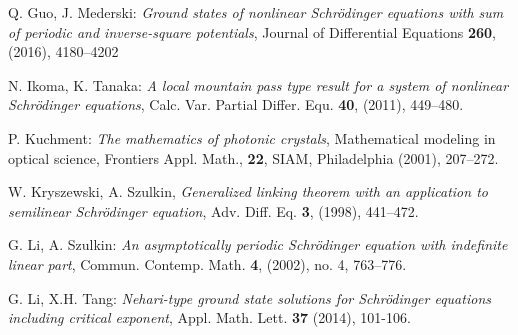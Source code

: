 \documentclass{scrartcl}
\newcommand{\R}{\mathbb{R}}
\numberwithin{equation}{section}
\begin{document}
\begin{thebibliography}{99}
 Q. Guo, J. Mederski: {\em Ground states of nonlinear Schr\"odinger equations with sum of periodic and inverse-square potentials}, Journal of Differential Equations \textbf{260}, (2016), 4180--4202

 N. Ikoma, K. Tanaka: {\em A local mountain pass type result for a system of nonlinear Schr\"odinger equations}, Calc. Var. Partial Differ. Equ. \textbf{40}, (2011), 449--480.



 P. Kuchment: {\em The mathematics of photonic crystals}, Mathematical modeling in optical science, Frontiers Appl. Math., \textbf{22}, SIAM, Philadelphia (2001), 207--272.

 W. Kryszewski, A. Szulkin, {\em Generalized linking theorem with an application to semilinear Schr\"odinger equation}, Adv. Diff. Eq. \textbf{3}, (1998), 441--472.



 G. Li, A. Szulkin: {\em An asymptotically periodic Schr\"odinger equation with indefinite linear part}, Commun. Contemp. Math. \textbf{4}, (2002), no. 4, 763--776.

 G. Li, X.H. Tang: {\em Nehari-type ground state solutions for Schr\"{o}dinger equations including critical exponent}, Appl. Math. Lett. \textbf{37} (2014), 101-106.







\end{thebibliography}
\end{document}
